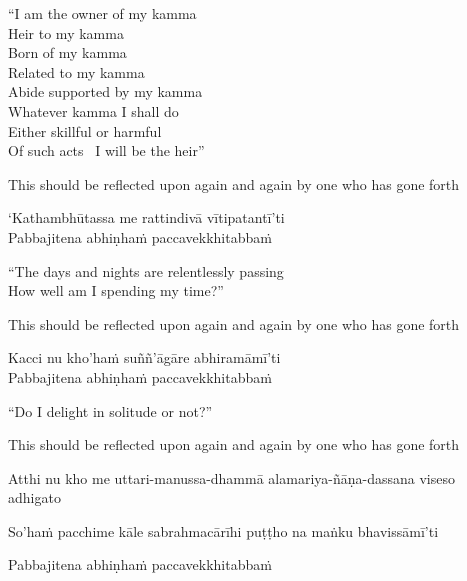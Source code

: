 \begin{english-verses}
  ``I am the owner of my kamma\\
  Heir to my kamma\\
  Born of my kamma\\
  Related to my kamma\\
  Abide supported by my kamma\\
  Whatever kamma I shall do\\
  Either skillful or harmful\\
  Of such acts \breathmark\ I will be the heir''\makeatletter\hyperlink{endnote102-appendix}\makeatother
  \begin{english-hangtogether-verses}
    This should be reflected upon again and again by one who has gone forth
  \end{english-hangtogether-verses}
\end{english-verses}

`Kathambhūtassa me rattindivā vītipatantī'ti\\
Pabbajitena abhiṇhaṁ paccavekkhitabbaṁ

\begin{english-verses}
  ``The days and nights are relentlessly passing\\
  How well am I spending my time?''
  \begin{english-hangtogether-verses}
    This should be reflected upon again and again by one who has gone forth
  \end{english-hangtogether-verses}
\end{english-verses}

Kacci nu kho'haṁ suññ'āgāre abhiramāmī'ti\\
Pabbajitena abhiṇhaṁ paccavekkhitabbaṁ

\begin{english-verses}
  ``Do I delight in solitude or not?''
  \begin{english-hangtogether-verses}
    This should be reflected upon again and again by one who has gone forth
  \end{english-hangtogether-verses}
\end{english-verses}

\begin{pali-hang}
  Atthi nu kho me uttari-manussa-dhammā alamariya-ñāṇa-dassana viseso adhigato
\end{pali-hang}
\begin{pali-hangtogether}
  So'haṁ pacchime kāle sabrahmacārīhi puṭṭho na maṅku bhavissāmī'ti
\end{pali-hangtogether}
\begin{pali-hangtogether}
Pabbajitena abhiṇhaṁ paccavekkhitabbaṁ
\end{pali-hangtogether}

